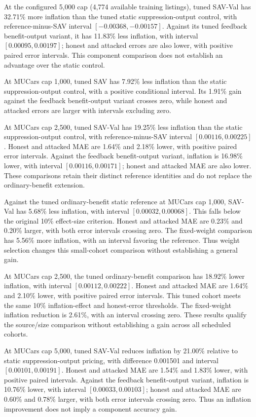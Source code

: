\documentclass[pdflatex,sn-nature]{sn-jnl}
\begin{document}
At the configured 5,000 cap (4,774 available training listings), tuned SAV-Val
has 32.71\% more inflation than the tuned static suppression-output control,
with reference-minus-SAV interval $[-0.00368,-0.00157]$. Against its tuned
feedback benefit-output variant, it has 11.83\% less inflation, with interval
$[0.00095,0.00197]$; honest and attacked errors are also lower, with positive
paired error intervals. This component comparison does not establish an
advantage over the static control.

At MUCars cap 1,000, tuned SAV has 7.92\% less inflation than the static
suppression-output control, with a positive conditional interval. Its
1.91\% gain against the feedback benefit-output variant crosses zero,
while honest and attacked errors are larger with intervals excluding zero.

At MUCars cap 2,500, tuned SAV-Val has 19.25\% less inflation than the
static suppression-output control, with reference-minus-SAV interval
$[0.00116,0.00225]$. Honest and attacked MAE are 1.64\% and 2.18\% lower,
with positive paired error intervals. Against the feedback benefit-output
variant, inflation is 16.98\% lower, with interval $[0.00116,0.00171]$;
honest and attacked MAE are also lower. These comparisons retain their
distinct reference identities and do not replace the ordinary-benefit
extension.

Against the tuned ordinary-benefit static reference at MUCars cap 1,000,
SAV-Val has 5.68\% less inflation, with interval $[0.00032,0.00068]$.
This falls below the original 10\% effect-size criterion. Honest and attacked
MAE are 0.23\% and 0.20\% larger, with both error intervals crossing zero.
The fixed-weight comparison has 5.56\% more inflation, with an interval
favoring the reference. Thus weight selection changes this small-cohort
comparison without establishing a general gain.

At MUCars cap 2,500, the tuned ordinary-benefit comparison has 18.92\% lower inflation, with interval $[0.00112,0.00222]$. Honest and attacked MAE are 1.64\% and 2.10\% lower, with positive paired error intervals. This tuned cohort meets the same 10\% inflation-effect and honest-error thresholds. The fixed-weight inflation reduction is 2.61\%, with an interval crossing zero. These results qualify the source/size comparison without establishing a gain across all scheduled cohorts.

At MUCars cap 5,000, tuned SAV-Val reduces inflation by 21.00\% relative to
static suppression-output pricing, with difference 0.001501 and interval
$[0.00101,0.00191]$. Honest and attacked MAE are 1.54\% and 1.83\% lower,
with positive paired intervals. Against the feedback benefit-output variant,
inflation is 10.76\% lower, with interval $[0.00033,0.00103]$; honest and
attacked MAE are 0.60\% and 0.78\% larger, with both error intervals crossing
zero. Thus an inflation improvement does not imply a component accuracy gain.
\end{document}

